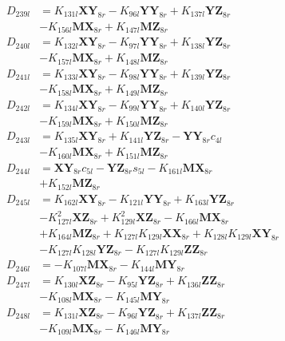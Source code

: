 \begin{multicols}{2}
\begin{align}
D_{239l} &= K_{131l}\mathbf{XY}_{8r} - K_{96l}\mathbf{YY}_{8r} + K_{137l}\mathbf{YZ}_{8r}  \nonumber \\
&- K_{156l}\mathbf{MX}_{8r} + K_{147l}\mathbf{MZ}_{8r} \nonumber \\
D_{240l} &= K_{132l}\mathbf{XY}_{8r} - K_{97l}\mathbf{YY}_{8r} + K_{138l}\mathbf{YZ}_{8r}  \nonumber \\
&- K_{157l}\mathbf{MX}_{8r} + K_{148l}\mathbf{MZ}_{8r} \nonumber \\
D_{241l} &= K_{133l}\mathbf{XY}_{8r} - K_{98l}\mathbf{YY}_{8r} + K_{139l}\mathbf{YZ}_{8r}  \nonumber \\
&- K_{158l}\mathbf{MX}_{8r} + K_{149l}\mathbf{MZ}_{8r} \nonumber \\
D_{242l} &= K_{134l}\mathbf{XY}_{8r} - K_{99l}\mathbf{YY}_{8r} + K_{140l}\mathbf{YZ}_{8r}  \nonumber \\
&- K_{159l}\mathbf{MX}_{8r} + K_{150l}\mathbf{MZ}_{8r} \nonumber \\
D_{243l} &= K_{135l}\mathbf{XY}_{8r} + K_{141l}\mathbf{YZ}_{8r} - \mathbf{YY}_{8r}c_{4l}  \nonumber \\
&- K_{160l}\mathbf{MX}_{8r} + K_{151l}\mathbf{MZ}_{8r} \nonumber \\
D_{244l} &= \mathbf{XY}_{8r}c_{5l} - \mathbf{YZ}_{8r}s_{5l} - K_{161l}\mathbf{MX}_{8r}  \nonumber \\
&+ K_{152l}\mathbf{MZ}_{8r} \nonumber \\
D_{245l} &= K_{162l}\mathbf{XY}_{8r} - K_{121l}\mathbf{YY}_{8r} + K_{163l}\mathbf{YZ}_{8r}  \nonumber \\
&- K_{127l}^2\mathbf{XZ}_{8r} + K_{129l}^2\mathbf{XZ}_{8r} - K_{166l}\mathbf{MX}_{8r}  \nonumber \\
&+ K_{164l}\mathbf{MZ}_{8r} + K_{127l}K_{129l}\mathbf{XX}_{8r} + K_{128l}K_{129l}\mathbf{XY}_{8r}  \nonumber \\
&- K_{127l}K_{128l}\mathbf{YZ}_{8r} - K_{127l}K_{129l}\mathbf{ZZ}_{8r} \nonumber \\
D_{246l} &= - K_{107l}\mathbf{MX}_{8r} - K_{144l}\mathbf{MY}_{8r} \nonumber \\
D_{247l} &= K_{130l}\mathbf{XZ}_{8r} - K_{95l}\mathbf{YZ}_{8r} + K_{136l}\mathbf{ZZ}_{8r}  \nonumber \\
&- K_{108l}\mathbf{MX}_{8r} - K_{145l}\mathbf{MY}_{8r} \nonumber \\
D_{248l} &= K_{131l}\mathbf{XZ}_{8r} - K_{96l}\mathbf{YZ}_{8r} + K_{137l}\mathbf{ZZ}_{8r}  \nonumber \\
&- K_{109l}\mathbf{MX}_{8r} - K_{146l}\mathbf{MY}_{8r} \nonumber \\

\end{align}
\end{multicols}
